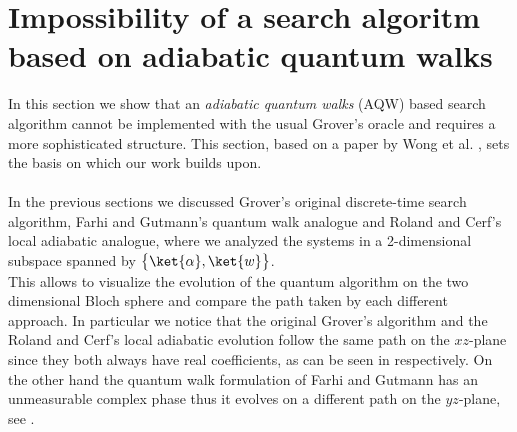 \section[Adiabatic-quantum walk search]{Impossibility of a search algoritm based on adiabatic quantum walks}\label{impossibility}
In this section we show that an \textit{adiabatic quantum walks} (AQW) based search algorithm cannot be implemented with the usual Grover's oracle and requires a more sophisticated structure. This section, based on a paper by Wong et al. \cite{Wong2016}, sets the basis on which our work builds upon. \\ \\
In the previous sections we discussed Grover's original discrete-time search algorithm, Farhi and Gutmann's quantum walk analogue and Roland and Cerf's local adiabatic analogue, where we analyzed the systems in a 2-dimensional subspace spanned by $\big\{\ket{\alpha}, \ket{w}\big\}$. \\This allows to visualize the evolution of the quantum algorithm on the two dimensional Bloch sphere and compare the path taken by each different approach. In particular we notice that the original Grover's algorithm and the Roland and Cerf's local adiabatic evolution follow the same path on the $xz$-plane since they both always have real coefficients, as can be seen in  respectively. On the other hand the quantum walk formulation of Farhi and Gutmann has an unmeasurable complex phase thus it evolves on a different path on the $yz$-plane, see .
